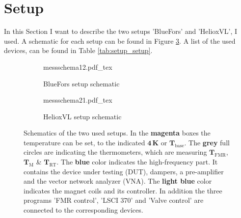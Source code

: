\section{Setup} \label{sec:setup_setup}
In this Section I want to describe the two setups 'BlueFors' and 'HelioxVL', I used. A schematic for each setup can be found in Figure \ref{fig:setup_schematic}. A list of the used devices, can be found in Table \ref{tab:setup_setup}.
\begin{figure}
     \centering
     \begin{subfigure}[b]{.45\textwidth}
         \centering
    {messschema12.pdf_tex}
         \caption{BlueFors setup schematic}
         \label{fig:setup_schematic_bluefors}
     \end{subfigure}
     \begin{subfigure}[b]{.45\textwidth}
         \centering
    {messschema21.pdf_tex}
         \caption{HelioxVL setup schematic}
         \label{fig:setup_schematic_heliox}
     \end{subfigure}
        \caption[Schematics of the two setups]{Schematics of the two used setups. In the \textbf{\color{antiseeblau65}magenta} boxes the temperature can be set, to the indicated \textbf{\color{antiseeblau65}$\mathbf{4}\,$K} or \textbf{\color{antiseeblau65}$\boldsymbol{T}_\text{base}$}. The \textbf{\color[rgb]{0.49803922,0.49803922,0.49803922}grey} full circles are indicating the thermometers, which are measuring \textbf{\color[rgb]{0.49803922,0.49803922,0.49803922}$\boldsymbol{T}_\text{FMR}$}, \textbf{\color[rgb]{0.49803922,0.49803922,0.49803922}$\boldsymbol{T}_\text{M}$} \& \textbf{\color[rgb]{0.49803922,0.49803922,0.49803922}$\boldsymbol{T}_\text{RT}$}. The \textbf{\color{seeblau100}blue} color indicates the high-frequency part. It contains the device under testing (DUT), dampers, a pre-amplifier and the vector network analyzer (VNA). The \textbf{\color{seeblau65}light blue} color indicates the magnet coils and its controller. In addition the three programs {\color{seeblau100}'FMR control'}, {\color[rgb]{0.49803922,0.49803922,0.49803922}'LSCI 370'} and {\color{antiseeblau65}'Valve control'} are connected to the corresponding devices.}
        \label{fig:setup_schematic}
\end{figure}

